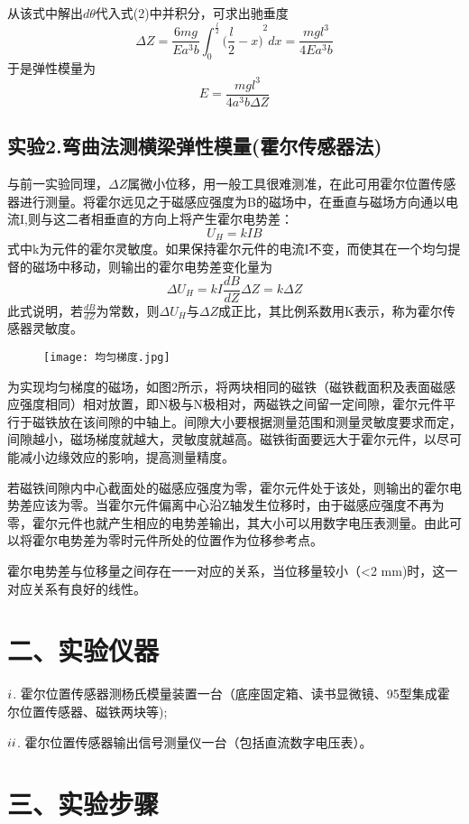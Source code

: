 \documentclass[11pt,a4paper,oneside]{article}
\begin{document}
从该式中解出$d{\theta}$代入式(2)中并积分，可求出驰垂度
 $${{\Delta}Z} = {\displaystyle\frac{6mg}{Ea^3b}}{\int_0^{\frac{l}{2}}({{\displaystyle\frac{l}{2}}-x)}^2dx} = {\displaystyle\frac{mgl^3}{4Ea^3b}}$$
于是弹性模量为
$$E = \displaystyle\frac{mgl^3}{4a^3b{\Delta}Z}$$

\subsection*{实验2.弯曲法测横梁弹性模量(霍尔传感器法)}
与前一实验同理，${\Delta}Z$属微小位移，用一般工具很难测准，在此可用霍尔位置传感器进行测量。将霍尔远见之于磁感应强度为B的磁场中，在垂直与磁场方向通以电流I,则与这二者相垂直的方向上将产生霍尔电势差：
 $$U_H =  kIB$$
式中k为元件的霍尔灵敏度。如果保持霍尔元件的电流I不变，而使其在一个均匀提督的磁场中移动，则输出的霍尔电势差变化量为
$${\Delta}U_H = kI{\displaystyle\frac{dB}{dZ}}{\Delta}Z = k{\Delta}Z$$ 
此式说明，若$\displaystyle\frac{dB}{dZ}$为常数，则${\Delta}U_H$与${\Delta}Z$成正比，其比例系数用K表示，称为霍尔传感器灵敏度。
\begin{figure}[htbp]
\centering
  \texttt{[image: 均匀梯度.jpg]}
\end{figure}
为实现均匀梯度的磁场，如图2所示，将两块相同的磁铁（磁铁截面积及表面磁感应强度相同）相对放置，即N极与N极相对，两磁铁之间留一定间隙，霍尔元件平行于磁铁放在该间隙的中轴上。间隙大小要根据测量范围和测量灵敏度要求而定，间隙越小，磁场梯度就越大，灵敏度就越高。磁铁街面要远大于霍尔元件，以尽可能减小边缘效应的影响，提高测量精度。
 
若磁铁间隙内中心截面处的磁感应强度为零，霍尔元件处于该处，则输出的霍尔电势差应该为零。当霍尔元件偏离中心沿Z轴发生位移时，由于磁感应强度不再为零，霍尔元件也就产生相应的电势差输出，其大小可以用数字电压表测量。由此可以将霍尔电势差为零时元件所处的位置作为位移参考点。

霍尔电势差与位移量之间存在一一对应的关系，当位移量较小（<2 mm)时，这一对应关系有良好的线性。
\section*{二、实验仪器}
${\romannumeral1}$.	霍尔位置传感器测杨氏模量装置一台（底座固定箱、读书显微镜、95型集成霍尔位置传感器、磁铁两块等);

${\romannumeral2}$.	霍尔位置传感器输出信号测量仪一台（包括直流数字电压表）。
\section*{三、实验步骤}
\end{document}
